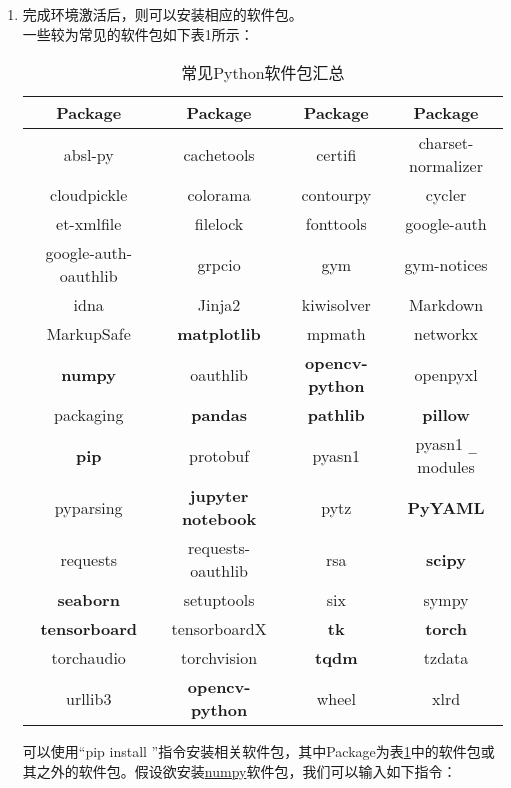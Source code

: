 \documentclass[11pt]{article}
\begin{document}
\begin{enumerate}
    	\item 完成环境激活后，则可以安装相应的软件包。\\
    	一些较为常见的软件包如下表1所示：
    	\begin{table}[H]
    		\centering
    		\caption{常见Python软件包汇总}
    		\setlength{\tabcolsep}{15pt}
    		\begin{tabular}{@{}c|c|c|c@{}}
    			\toprule
    			\textbf{Package} & \textbf{Package} & \textbf{Package} & \textbf{Package} \\
    			\midrule
    			absl-py & cachetools & certifi & charset-normalizer \\
    			cloudpickle & colorama & contourpy & cycler \\
    			et-xmlfile & filelock & fonttools & google-auth \\
    			google-auth-oauthlib & grpcio & gym & gym-notices \\
    			idna & Jinja2 & kiwisolver & Markdown \\
    			MarkupSafe & \textbf{matplotlib} & mpmath & networkx \\
    			\textbf{numpy} & oauthlib & \textbf{opencv-python} & openpyxl \\
    			packaging & \textbf{pandas} & \textbf{pathlib} & \textbf{pillow} \\
    			\textbf{pip} & protobuf & pyasn1 & pyasn1 \verb*|_| modules \\
    			pyparsing & \textbf{jupyter notebook} & pytz & \textbf{PyYAML} \\
    			requests & requests-oauthlib & rsa & \textbf{scipy} \\
    			\textbf{seaborn} & setuptools & six & sympy \\
    			\textbf{tensorboard} & tensorboardX & \textbf{tk} & \textbf{torch} \\
    			torchaudio & torchvision & \textbf{tqdm} & tzdata \\
    			urllib3 & \textbf{opencv-python} & wheel & xlrd \\
    			\bottomrule
    		\end{tabular}
    		\label{table1}
    	\end{table}
    	可以使用“pip install ”指令安装相关软件包，其中Package为表\ref{table1}中的软件包或其之外的软件包。假设欲安装\underline{numpy}软件包，我们可以输入如下指令：\\
    	

\end{enumerate}
\end{document}

